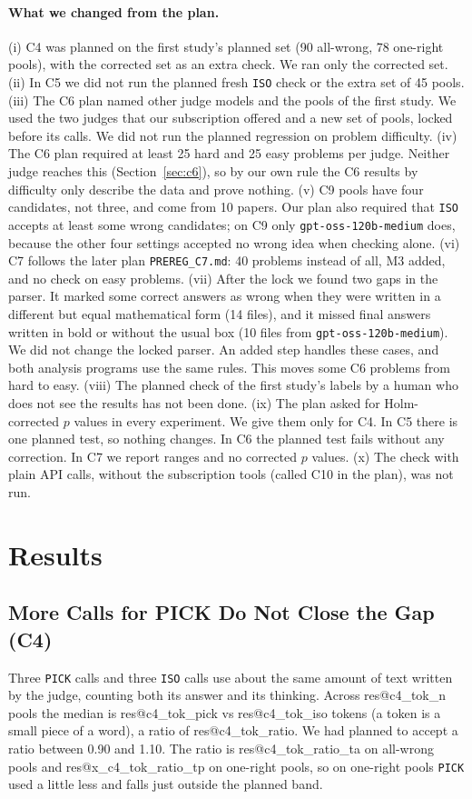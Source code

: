 \documentclass[10pt,twocolumn]{article}
\makeatletter
\newcommand{\res}[1]{\csname res@#1\endcsname}
\makeatother
\begin{document}
\paragraph{What we changed from the plan.}
(i) C4 was planned on the first study's planned set (90 all-wrong, 78 one-right pools), with the corrected set as an extra check. We ran only the corrected set. (ii) In C5 we did not run the planned fresh \texttt{ISO} check or the extra set of 45 pools. (iii) The C6 plan named other judge models and the pools of the first study. We used the two judges that our subscription offered and a new set of pools, locked before its calls. We did not run the planned regression on problem difficulty. (iv) The C6 plan required at least 25 hard and 25 easy problems per judge. Neither judge reaches this (Section~\ref{sec:c6}), so by our own rule the C6 results by difficulty only describe the data and prove nothing. (v) C9 pools have four candidates, not three, and come from 10 papers. Our plan also required that \texttt{ISO} accepts at least some wrong candidates; on C9 only \texttt{gpt-oss-120b-medium} does, because the other four settings accepted no wrong idea when checking alone. (vi) C7 follows the later plan \texttt{PREREG\_C7.md}: 40 problems instead of all, M3 added, and no check on easy problems. (vii) After the lock we found two gaps in the parser. It marked some correct answers as wrong when they were written in a different but equal mathematical form (14 files), and it missed final answers written in bold or without the usual box (10 files from \texttt{gpt-oss-120b-medium}). We did not change the locked parser. An added step handles these cases, and both analysis programs use the same rules. This moves some C6 problems from hard to easy. (viii) The planned check of the first study's labels by a human who does not see the results has not been done. (ix) The plan asked for Holm-corrected $p$ values in every experiment. We give them only for C4. In C5 there is one planned test, so nothing changes. In C6 the planned test fails without any correction. In C7 we report ranges and no corrected $p$ values. (x) The check with plain API calls, without the subscription tools (called C10 in the plan), was not run.

\section{Results}

\subsection{More Calls for PICK Do Not Close the Gap (C4)}
\label{sec:c4}
Three \texttt{PICK} calls and three \texttt{ISO} calls use about the same amount of text written by the judge, counting both its answer and its thinking. Across \res{c4_tok_n} pools the median is \res{c4_tok_pick} vs \res{c4_tok_iso} tokens (a token is a small piece of a word), a ratio of \res{c4_tok_ratio}. We had planned to accept a ratio between 0.90 and 1.10. The ratio is \res{c4_tok_ratio_ta} on all-wrong pools and \res{x_c4_tok_ratio_tp} on one-right pools, so on one-right pools \texttt{PICK} used a little less and falls just outside the planned band.
\end{document}
